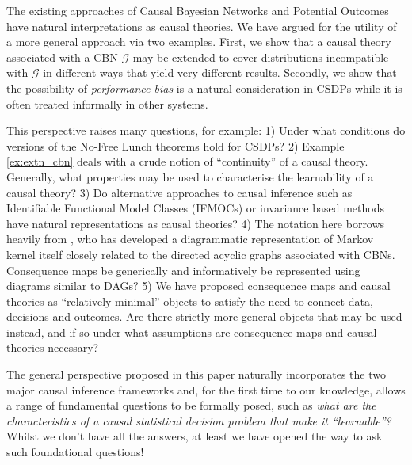 \documentclass{article}
\theoremstyle{plain}
\theoremstyle{definition}
\begin{document}
The existing approaches of Causal Bayesian Networks and Potential Outcomes have natural interpretations as causal theories. We have argued for the utility of a more general approach via two examples. First, we show that a causal theory associated with a CBN $\mathcal{G}$ may be extended to cover distributions incompatible with $\mathcal{G}$ in different ways that yield very different results. Secondly, we show that the possibility of \emph{performance bias} is a natural consideration in CSDPs while it is often treated informally in other systems.

This perspective raises many questions, for example: 1) Under what conditions do versions of the No-Free Lunch theorems hold for CSDPs? 2) Example \ref{ex:extn_cbn} deals with a crude notion of ``continuity'' of a causal theory. Generally, what properties may be used to characterise the learnability of a causal theory? 3) Do alternative approaches to causal inference such as Identifiable Functional Model Classes (IFMOCs) or invariance based methods have natural representations as causal theories? 4) The notation here borrows heavily from \citep{fong_causal_2013}, who has developed a diagrammatic representation of Markov kernel itself closely related to the directed acyclic graphs associated with CBNs. Consequence maps be generically and informatively be represented using diagrams similar to DAGs? 5) We have proposed consequence maps and causal theories as ``relatively minimal'' objects to satisfy the need to connect data, decisions and outcomes. Are there strictly more general objects that may be used instead, and if so under what assumptions are consequence maps and causal theories necessary?

The general perspective proposed in this paper naturally incorporates the two major causal inference frameworks and, for the first time to our knowledge, allows a range of fundamental questions to be formally posed, such as \emph{what are the characteristics of a causal statistical decision problem that make it ``learnable”?} Whilst we don’t have all the answers, at least we have opened the way to ask such foundational questions!









\end{document}
